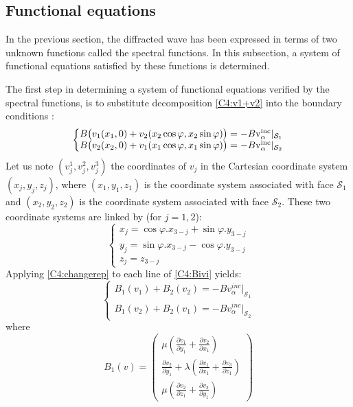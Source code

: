 \subsection{Functional equations}
In the previous section, the diffracted wave has been expressed in terms of two unknown functions called the spectral functions. In this subsection, a system of functional equations satisfied by these functions is determined. 

The first step in determining a system of functional equations verified by the spectral functions, is to substitute decomposition \eqref{C4:v1+v2} into the boundary conditions :
\begin{equation}
\left\{
\begin{matrix}
B \big( v_1(x_1,0)+v_2(x_2 \cos \varphi, x_2 \sin \varphi) \big) = -B \rm v_{\alpha}^{inc}|_{\mathcal{S}_1} \\
B \big( v_2(x_2,0)+v_1(x_1 \cos \varphi, x_1 \sin \varphi) \big) = -B \rm v_{\alpha}^{inc}|_{\mathcal{S}_2}
\end{matrix}
\right.
\label{C4:Bivi}
\end{equation}
Let us note $(v_j^1,v_j^2,v_j^3)$ the coordinates of $v_j$ in the Cartesian coordinate system $(x_j,y_j,z_j)$, where $(x_1,y_1,z_1)$ is the coordinate system associated with face $\mathcal{S}_1$ and $(x_2,y_2,z_2)$ is the coordinate system associated with face $\mathcal{S}_2$. These two coordinate systems are linked by (for $j=1,2$):
\begin{equation}
    \left\{
    \begin{matrix}
    x_j=\cos\varphi .x_{3-j}+\sin\varphi. y_{3-j}\\
    y_j=\sin\varphi .x_{3-j}-\cos\varphi .y_{3-j}\\
    z_j=z_{3-j}
    \end{matrix}
    \right.
    \label{C4:changerep}
\end{equation}
Applying \eqref{C4:changerep} to each line of \eqref{C4:Bivi} yields: 
\begin{equation}
\left\{
\begin{matrix}
B_1(v_1)+B_2(v_2)=-Bv_{\alpha}^{inc}|_{\mathcal{S}_1} \\
B_1(v_2)+B_2(v_1)=-Bv_{\alpha}^{inc}|_{\mathcal{S}_2}
\end{matrix}
\right.
\label{C4:b1v1+b2v2}
\end{equation}
where
\begin{equation}
B_1(v)=
\begin{pmatrix}
\mu \left( \frac{\partial v_1}{\partial y_1}+\frac{\partial v_2}{\partial x_1} \right) \\
\frac{\partial v_2}{\partial y_1}+\lambda \left( \frac{\partial v_1}{\partial x_1}+\frac{\partial v_3}{\partial z_1} \right)\\
\mu \left( \frac{\partial v_2}{\partial z_1}+ \frac{\partial v_3}{\partial y_1}\right)
\end{pmatrix}
\label{C4:B1v1expl}
\end{equation}
